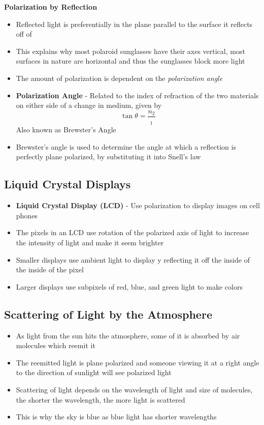 \textbf{Polarization by Reflection}
\begin{itemize}
    \item Reflected light is preferentially in the plane parallel to the surface it reflects off of
    \item This explains why most polaroid sunglasses have their axes vertical, most surfaces in nature are horizontal and thus the sunglasses block more light 
    \item The amount of polarization is dependent on the \emph{polarization angle}
    \item \textbf{Polarization Angle} - Related to the index of refraction of the two materials on either side of a change in medium, given by \[\tan{\theta}=\frac{n_2}{_1}\] Also known as Brewster's Angle
    \item Brewster's angle is used to determine the angle at which a reflection is perfectly plane polarized, by substituting it into Snell's law
\end{itemize}

\subsection{Liquid Crystal Displays}
\begin{itemize}
    \item \textbf{Liquid Crystal Display (LCD)} - Use polarization to display images on cell phones
    \item The pixels in an LCD use rotation of the polarized axis of light to increase the intensity of light and make it seem brighter
    \item Smaller displays use ambient light to display y reflecting it off the inside of the inside of the pixel
    \item Larger displays use subpixels of red, blue, and green light to make colors
\end{itemize}

\subsection{Scattering of Light by the Atmosphere}
\begin{itemize}
    \item As light from the sun hits the atmosphere, some of it is absorbed by air molecules which reemit it
    \item The reemitted light is plane polarized and someone viewing it at a right angle to the direction of sunlight will see polarized light
    \item Scattering of light depends on the wavelength of light and size of molecules, the shorter the wavelength, the more light is scattered
    \item This is why the sky is blue as blue light has shorter wavelengths
\end{itemize}

\newpage
